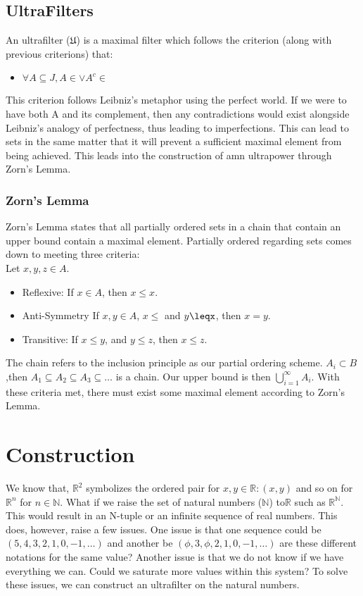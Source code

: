 \documentclass[12pt]{report}
\newcommand{\R}{\mathbb{R}}
\newcommand{\N}{\mathbb{N}}
\begin{document}
\section*{UltraFilters}
An ultrafilter ($\mathfrak{U}$) is a maximal filter which follows the criterion (along with previous criterions) that:
\begin{itemize}
    \item $\forall A \subseteq J , A \in $$ \lor A^c \in $$ $
\end{itemize}
This criterion follows Leibniz's metaphor using the perfect world.
If we were to have both A and its complement, then any contradictions would exist alongside Leibniz's analogy of perfectness, thus leading to imperfections.
This can lead to sets in the same matter that it will prevent a sufficient maximal element from being achieved.
This leads into the construction of amn ultrapower through Zorn's Lemma.
\subsection*{Zorn's Lemma}
Zorn's Lemma states that all partially ordered sets in a chain that contain an upper bound contain a maximal element.
Partially ordered regarding sets comes down to meeting three criteria:\\
Let $x,y,z \in A$.
\begin{itemize}
    \item Reflexive: If $x \in A$, then $x\leq x$.
    \item Anti-Symmetry If $x,y \in A$, $x\leq$ and $y\leqx$, then $x=y$.
    \item Transitive: If $x \leq y$, and $y \leq z$, then $x \leq z$.
\end{itemize}
The chain refers to the inclusion principle as our partial ordering scheme.
$A_i \subset B$ ,then $A_1\subseteq A_2\subseteq A_3\subseteq\ldots$ is a chain.
Our upper bound is then $\bigcup_{i=1}^{\infty}A_i$.
With these criteria met, there must exist some maximal element according to Zorn's Lemma.

\chapter{Construction}
We know that, $\R^2 $ symbolizes the ordered pair for $x, y \in \R: (x, y)$ and so on for $\R^n$ for $n \in \N$.
What if we raise the set of natural numbers ($\N$) to$ \R$ such as $\R^{\N}$.
This would result in an N-tuple or an infinite sequence of real numbers.
This does, however, raise a few issues.
One issue is that one sequence could be $(5,4,3,2,1,0,-1,\ldots)$ and another be $(\phi,3,\phi, 2,1,0,-1,\ldots)$ are these different notations for the same value?
Another issue is that we do not know if we have everything we can.
Could we saturate more values within this system?
To solve these issues, we can construct an ultrafilter on the natural numbers.\par
\end{document}
